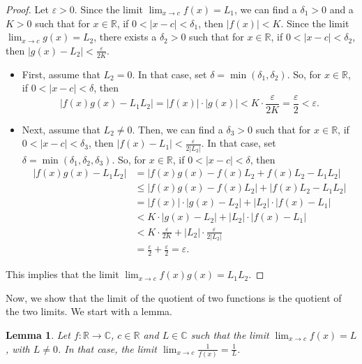\documentclass[a4paper, openany]{memoir}
\theoremstyle{definition}
\theoremstyle{plain}
\newtheorem{lemma}[definition]{Lemma}
\begin{document}
\begin{proof}
Let $\varepsilon > 0$. Since the limit $\lim_{x \to c} f(x) = L_1$, we can find a $\delta_1 > 0$ and a $K > 0$ such that for $x \in \mathbb{R}$, if $0 < |x - c| < \delta_1$, then $|f(x)| < K$. Since the limit $\lim_{x \to c} g(x) = L_2$, there exists a $\delta_2 > 0$ such that for $x \in \mathbb{R}$, if $0 < |x - c| < \delta_2$, then $|g(x) - L_2| < \frac{\varepsilon}{2K}$.
\begin{itemize}
    \item First, assume that $L_2 = 0$. In that case, set $\delta = \min(\delta_1, \delta_2)$. So, for $x \in \mathbb{R}$, if $0 < |x - c| < \delta$, then
    \[|f(x) g(x) - L_1 L_2| = |f(x)| \cdot |g(x)| < K \cdot \frac{\varepsilon}{2K} = \frac{\varepsilon}{2} < \varepsilon.\]
    \item Next, assume that $L_2 \neq 0$. Then, we can find a $\delta_3 > 0$ such that for $x \in \mathbb{R}$, if $0 < |x - c| < \delta_3$, then $|f(x) - L_1| < \frac{\varepsilon}{2|L_2|}$. In that case, set $\delta = \min(\delta_1, \delta_2, \delta_3)$. So, for $x \in \mathbb{R}$, if $0 < |x - c| < \delta$, then
    \begin{align*}
        |f(x) g(x) - L_1 L_2| &= |f(x) g(x) - f(x) L_2 + f(x) L_2 - L_1 L_2| \\
        &\leqslant |f(x) g(x) - f(x) L_2| + |f(x) L_2 - L_1 L_2| \\
        &= |f(x)| \cdot |g(x) - L_2| + |L_2| \cdot |f(x) - L_1| \\
        &< K \cdot |g(x) - L_2| + |L_2| \cdot |f(x) - L_1| \\
        &< K \cdot \frac{\varepsilon}{2K} + |L_2| \cdot \frac{\varepsilon}{2|L_2|} \\
        &= \frac{\varepsilon}{2} + \frac{\varepsilon}{2} = \varepsilon.
    \end{align*}
\end{itemize}
This implies that the limit $\lim_{x \to c} f(x)g(x) = L_1 L_2$.
\end{proof}
\noindent Now, we show that the limit of the quotient of two functions is the quotient of the two limits. We start with a lemma.
\begin{lemma}
Let $f: \mathbb{R} \to \mathbb{C}$, $c \in \mathbb{R}$ and $L \in \mathbb{C}$ such that the limit $\lim_{x \to c} f(x) = L$, with $L \neq 0$. In that case, the limit $\lim_{x \to c} \frac{1}{f(x)} = \frac{1}{L}$.
\end{lemma}
\end{document}
